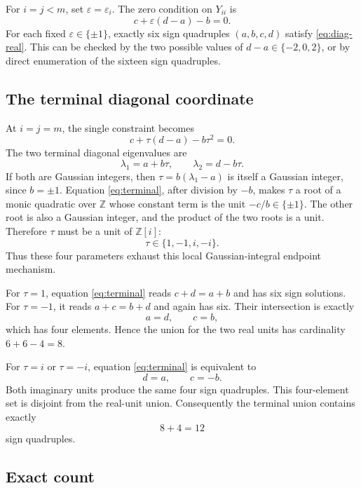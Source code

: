 \documentclass[11pt]{article}
\theoremstyle{remark}
\newcommand{\Z}{\mathbb Z}
\begin{document}
For $i=j<m$, set $\varepsilon=\varepsilon_i$.  The zero condition on $Y_{ii}$ is
\begin{equation}\label{eq:diag-real}
 c+\varepsilon(d-a)-b=0.
\end{equation}
For each fixed $\varepsilon\in\{\pm1\}$, exactly six sign quadruples $(a,b,c,d)$ satisfy \eqref{eq:diag-real}.  This can be checked by the two possible values of $d-a\in\{-2,0,2\}$, or by direct enumeration of the sixteen sign quadruples.

\subsection{The terminal diagonal coordinate}

At $i=j=m$, the single constraint becomes
\begin{equation}\label{eq:terminal}
 c+\tau(d-a)-b\tau^2=0.
\end{equation}
The two terminal diagonal eigenvalues are
\[
 \lambda_1=a+b\tau,
 \qquad
 \lambda_2=d-b\tau.
\]
If both are Gaussian integers, then $\tau=b(\lambda_1-a)$ is itself a Gaussian integer, since $b=\pm1$.  Equation \eqref{eq:terminal}, after division by $-b$, makes $\tau$ a root of a monic quadratic over $\Z$ whose constant term is the unit $-c/b\in\{\pm1\}$.  The other root is also a Gaussian integer, and the product of the two roots is a unit.  Therefore $\tau$ must be a unit of $\Z[i]$:
\[
 \tau\in\{1,-1,i,-i\}.
\]
Thus these four parameters exhaust this local Gaussian-integral endpoint mechanism.

For $\tau=1$, equation \eqref{eq:terminal} reads $c+d=a+b$ and has six sign solutions.  For $\tau=-1$, it reads $a+c=b+d$ and again has six.  Their intersection is exactly
\[
 a=d,\qquad c=b,
\]
which has four elements.  Hence the union for the two real units has cardinality $6+6-4=8$.

For $\tau=i$ or $\tau=-i$, equation \eqref{eq:terminal} is equivalent to
\[
 d=a,\qquad c=-b.
\]
Both imaginary units produce the same four sign quadruples.  This four-element set is disjoint from the real-unit union.  Consequently the terminal union contains exactly
\begin{equation}\label{eq:terminal-count}
 8+4=12
\end{equation}
sign quadruples.

\subsection{Exact count}
\end{document}
